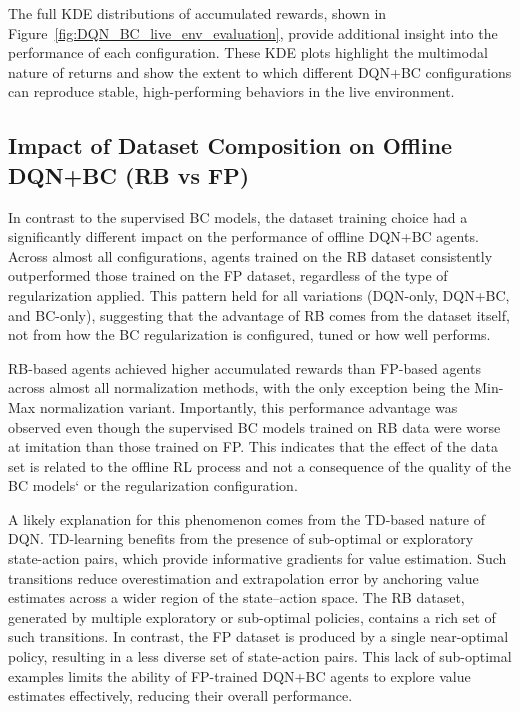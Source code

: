 The full KDE distributions of accumulated rewards, shown in Figure~\ref{fig:DQN_BC_live_env_evaluation}, provide additional insight into the performance of each configuration. These KDE plots highlight the multimodal nature of returns and show the extent to which different DQN+BC configurations can reproduce stable, high-performing behaviors in the live environment.






\subsection{Impact of Dataset Composition on Offline DQN+BC (RB vs FP)}
In contrast to the supervised BC models, the dataset training choice had a significantly different impact on the performance of offline DQN+BC agents. Across almost all configurations, agents trained on the RB dataset consistently outperformed those trained on the FP dataset, regardless of the type of regularization applied. This pattern held for all variations (DQN-only, DQN+BC, and BC-only), suggesting that the advantage of RB comes from the dataset itself, not from how the BC regularization is configured, tuned or how well performs.


RB-based agents achieved higher accumulated rewards than FP-based agents across almost all normalization methods, with the only exception being the Min-Max normalization variant. Importantly, this performance advantage was observed even though the supervised BC models trained on RB data were worse at imitation than those trained on FP. This indicates that the effect of the data set is related to the offline RL process and not a consequence of the quality of the BC models` or the regularization configuration.

A likely explanation for this phenomenon comes from the TD-based nature of DQN. TD-learning benefits from the presence of sub-optimal or exploratory state-action pairs, which provide informative gradients for value estimation. Such transitions reduce overestimation and extrapolation error by anchoring value estimates across a wider region of the state–action space. The RB dataset, generated by multiple exploratory or sub-optimal policies, contains a rich set of such transitions. In contrast, the FP dataset is produced by a single near-optimal policy, resulting in a less diverse set of state-action pairs. This lack of sub-optimal examples limits the ability of FP-trained DQN+BC agents to explore value estimates effectively, reducing their overall performance.

